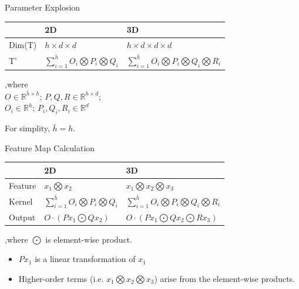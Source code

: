 \documentclass[compress]{beamer}
\begin{document}
\begin{frame}[allowframebreaks]{\subsecname}
\begin{block}{Parameter Explosion}
\begin{itemize}
\begin{table}[t]
\begin{tabular}{lll}
                            & 2D                                                              & 3D
                           \\ \hline
                    Dim(T)  & $h\times d \times d$                                            & $h\times d \times d \times d$                                                  \\ \hline
                    T'      & $\sum\limits_{i=1}^{\bar{h}} O_i \bigotimes P_i \bigotimes Q_i$ & $\sum\limits_{i=1}^{\bar{h}} O_i \bigotimes P_i \bigotimes Q_i \bigotimes R_i$ \\ \hline
                    \end{tabular}
                    \end{table}
                    ,where\\
                    $O \in \mathbb{R}^{\bar{h} \times h}$; $P, Q, R \in \mathbb{R}^{h\times d}$; \\
                    $O_i \in \mathbb{R}^h$; $P_i, Q_i, R_i \in \mathbb{R}^d$

                    For simplity, $\bar{h}=h$.
                \end{itemize}
            \end{block}
        \framebreak
            \begin{block}{Feature Map Calculation}
                \begin{table}[t]
                \centering
                \begin{tabular}{lll}
                        & 2D                                                              & 3D                                                                             \\ \hline
                Feature & $x_1 \bigotimes x_2$                                            & $x_1 \bigotimes x_2 \bigotimes x_3$                                            \\ \hline
                Kernel  & $\sum\limits_{i=1}^{\bar{h}} O_i \bigotimes P_i \bigotimes Q_i$ & $\sum\limits_{i=1}^{\bar{h}} O_i \bigotimes P_i \bigotimes Q_i \bigotimes R_i$ \\ \hline
                Output  & $O \cdot (Px_1 \bigodot Qx_2)$                                   & $O \cdot (Px_1 \bigodot Qx_2 \bigodot Rx_3)$
                \end{tabular}
                \end{table}
                ,where $\bigodot$ is element-wise product. \\
                \begin{itemize}
                    \item $Px_1$ is a linear transformation of $x_1$
                    \item Higher-order terms (i.e. $x_1 \bigotimes x_2 \bigotimes x_3$) arise from the element-wise products.
                \end{itemize}
            \end{block}
        \end{frame}
\end{document}
